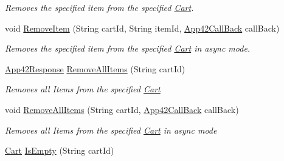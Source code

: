 \begin{DoxyCompactItemize}
\begin{DoxyCompactList}\small\item\em Removes the specified item from the specified \hyperlink{classcom_1_1shephertz_1_1app42_1_1paas_1_1sdk_1_1csharp_1_1shopping_1_1_cart}{Cart}. \end{DoxyCompactList}\item 
void \hyperlink{classcom_1_1shephertz_1_1app42_1_1paas_1_1sdk_1_1csharp_1_1shopping_1_1_cart_service_a747afaf9806661b95f0b4127c702b21c}{Remove\+Item} (String cart\+Id, String item\+Id, \hyperlink{interfacecom_1_1shephertz_1_1app42_1_1paas_1_1sdk_1_1csharp_1_1_app42_call_back}{App42\+Call\+Back} call\+Back)
\begin{DoxyCompactList}\small\item\em Removes the specified item from the specified \hyperlink{classcom_1_1shephertz_1_1app42_1_1paas_1_1sdk_1_1csharp_1_1shopping_1_1_cart}{Cart} in async mode. \end{DoxyCompactList}\item 
\hyperlink{classcom_1_1shephertz_1_1app42_1_1paas_1_1sdk_1_1csharp_1_1_app42_response}{App42\+Response} \hyperlink{classcom_1_1shephertz_1_1app42_1_1paas_1_1sdk_1_1csharp_1_1shopping_1_1_cart_service_ac3c829805feaf45cbd9534ef7c559dc0}{Remove\+All\+Items} (String cart\+Id)
\begin{DoxyCompactList}\small\item\em Removes all Items from the specified \hyperlink{classcom_1_1shephertz_1_1app42_1_1paas_1_1sdk_1_1csharp_1_1shopping_1_1_cart}{Cart} \end{DoxyCompactList}\item 
void \hyperlink{classcom_1_1shephertz_1_1app42_1_1paas_1_1sdk_1_1csharp_1_1shopping_1_1_cart_service_a824a4c53f39774a49743406d27bbae9e}{Remove\+All\+Items} (String cart\+Id, \hyperlink{interfacecom_1_1shephertz_1_1app42_1_1paas_1_1sdk_1_1csharp_1_1_app42_call_back}{App42\+Call\+Back} call\+Back)
\begin{DoxyCompactList}\small\item\em Removes all Items from the specified \hyperlink{classcom_1_1shephertz_1_1app42_1_1paas_1_1sdk_1_1csharp_1_1shopping_1_1_cart}{Cart} in async mode \end{DoxyCompactList}\item 
\hyperlink{classcom_1_1shephertz_1_1app42_1_1paas_1_1sdk_1_1csharp_1_1shopping_1_1_cart}{Cart} \hyperlink{classcom_1_1shephertz_1_1app42_1_1paas_1_1sdk_1_1csharp_1_1shopping_1_1_cart_service_a5385ec0de54daa89c870776d9b6e7cdc}{Is\+Empty} (String cart\+Id)

\end{DoxyCompactItemize}
